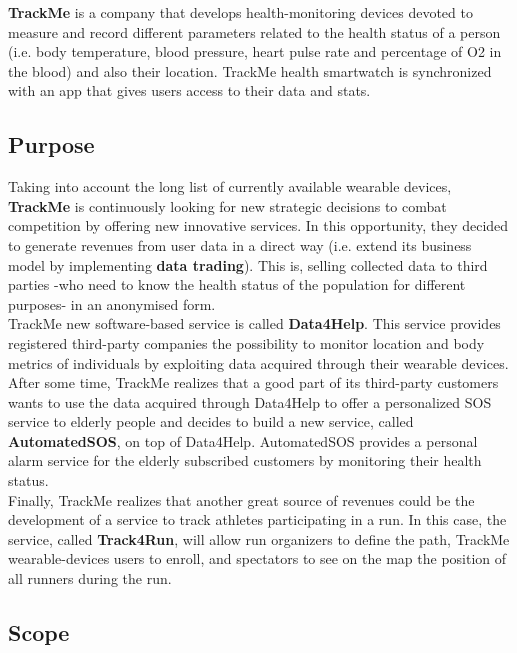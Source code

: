 \documentclass[12pt]{article}
\begin{document}
\textbf{TrackMe} is a company that develops health-monitoring devices devoted to measure and record different parameters related to the health status of a person (i.e. body temperature, blood pressure, heart pulse rate and percentage of O2 in the blood) and also their location. TrackMe health smartwatch is synchronized with an app that gives users access to their data and stats.  

\subsection{Purpose}
Taking into account the long list of currently available wearable devices, \textbf{TrackMe} is continuously looking for new strategic decisions to combat competition by offering new innovative services. In this opportunity, they decided to generate revenues from user data in a direct way (i.e. extend its business model by implementing \textbf{data trading}). This is, selling collected data to third parties -who need to know the health status of the population for different purposes- in an anonymised form.\\

TrackMe new software-based service is called \textbf{Data4Help}. This service provides registered third-party companies the possibility to monitor location and body metrics of individuals by exploiting data acquired through their wearable devices.\\

After some time, TrackMe realizes that a good part of its third-party customers wants to use the data acquired through Data4Help to offer a personalized SOS service to elderly people and decides to  build a new service, called \textbf{AutomatedSOS}, on top of Data4Help. AutomatedSOS provides a personal alarm service for the elderly subscribed customers by monitoring their health status.\\

Finally, TrackMe realizes that another great source of revenues could be the development of a service to track athletes participating in a run. In this case, the service, called \textbf{Track4Run}, will allow run organizers to define the path, TrackMe wearable-devices users to enroll, and spectators to see on the map the position of all runners during the run. \\

\subsection{Scope}
\end{document}
